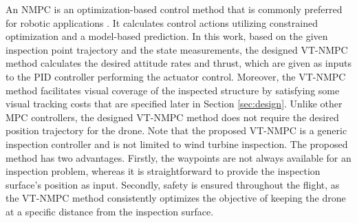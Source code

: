\documentclass[letterpaper, 10 pt, conference]{ieeeconf}  %
\begin{document}

An NMPC is an optimization-based control method that is commonly preferred for robotic applications {\cite{mpc_survey, Mohit2017Receding, Mohitacc2018, Mehndiratta2019,quadplux,tilt,mohit_fault_tolerant_c,mohit_3dprint,tractor, kraus_mpc, arm_mpc}}. It calculates control actions utilizing constrained optimization and a model-based prediction. In this work, based on the given inspection point trajectory and the state measurements, the designed \ac{VT-NMPC} method calculates the desired attitude rates and thrust, which are given as inputs to the PID controller performing the actuator control. Moreover, the \ac{VT-NMPC} method facilitates visual coverage of the inspected structure by satisfying some visual tracking costs that are specified later in Section \ref{sec:design}.
Unlike other MPC controllers, the designed \ac{VT-NMPC} method does not require the desired position trajectory for the drone. Note that the proposed VT-NMPC is a generic inspection controller and is not limited to wind turbine inspection. The proposed method has two advantages. Firstly, the waypoints are not always available for an inspection problem, whereas it is straightforward to provide the inspection surface's position as input. Secondly, safety is ensured throughout the flight, as the \ac{VT-NMPC} method consistently optimizes the objective of keeping the drone at a specific distance from the inspection surface. 



\end{document}
